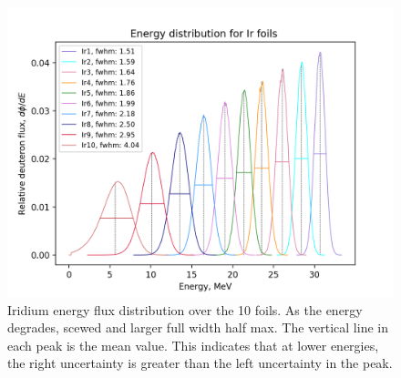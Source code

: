 \begin{figure}
    \centering
    \includegraphics{Analysis/Ir_flux_distribution_B_+2_D_+4,25.png}
    \caption{Iridium energy flux distribution over the 10 foils. As the energy degrades, scewed and larger full width half max. The vertical line in each peak is the mean value. This indicates that at lower energies, the right uncertainty is greater than the left uncertainty in the peak.}
    \label{fig:ir_energyflux}
\end{figure}

